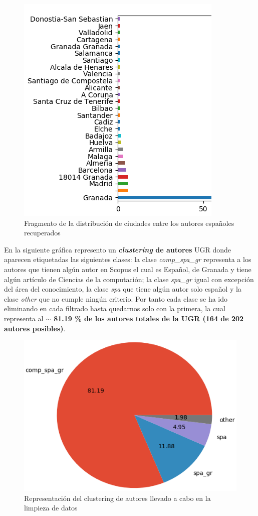 \begin{figure}[h]
	
	\centering
	\includegraphics[width=0.5775\linewidth]{imagenes/city_hist}
	\caption{Fragmento de la distribución de ciudades entre los autores españoles recuperados}
\end{figure}
\newpage

En la siguiente gráfica represento un \textbf{\textit{clustering} de autores} \acrshort{UGR} donde aparecen etiquetadas las siguientes clases: la clase \textit{comp\_spa\_gr} representa a los autores que tienen algún autor en Scopus el cual es Español, de Granada y tiene algún artículo de Ciencias de la computación; la clase \textit{spa\_gr} igual con excepción del área del conocimiento, la clase \textit{spa} que tiene algún autor solo español y la clase \textit{other} que no cumple ningún criterio. Por tanto cada clase se ha ido eliminando en cada filtrado hasta quedarnos solo con la primera, la cual representa al \textbf{$\sim$ 81.19 \% de los autores totales de la \acrshort{UGR} (164 de 202 autores posibles)}.

\begin{figure}[h]
	
	\centering
	\includegraphics[width=0.5\linewidth]{imagenes/class_pie}
	\caption{Representación del clustering de autores llevado a cabo en la limpieza de datos}
\end{figure}

